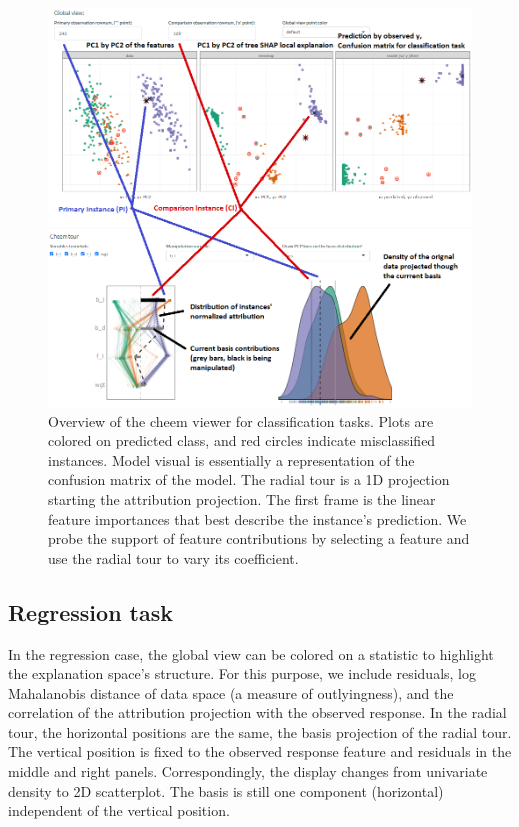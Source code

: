 \documentclass[
]{article}
\begin{document}
\begin{figure}

{\centering \includegraphics[width=1\linewidth]{./figures/app_classification_annotations} 

}

\caption{Overview of the cheem viewer for classification tasks. Plots are colored on predicted class, and red circles indicate misclassified instances. Model visual is essentially a representation of the confusion matrix of the model. The radial tour is a 1D projection starting the attribution projection. The first frame is the linear feature importances that best describe the instance's prediction. We probe the support of feature contributions by selecting a feature and use the radial tour to vary its coefficient.}\label{fig:classificationcase}
\end{figure}

\hypertarget{regression-task}{%
\subsection{Regression task}\label{regression-task}}

In the regression case, the global view can be colored on a statistic to highlight the explanation space's structure. For this purpose, we include residuals, log Mahalanobis distance of data space (a measure of outlyingness), and the correlation of the attribution projection with the observed response. In the radial tour, the horizontal positions are the same, the basis projection of the radial tour. The vertical position is fixed to the observed response feature and residuals in the middle and right panels. Correspondingly, the display changes from univariate density to 2D scatterplot. The basis is still one component (horizontal) independent of the vertical position.
\end{document}
